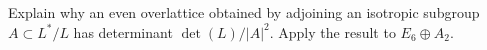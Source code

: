\begin{exercise}\label{ex:c-lattice-5}
Explain why an even overlattice obtained by adjoining an isotropic
subgroup $A\subset L^*/L$ has determinant $\det(L)/|A|^2$. Apply
the result to $E_6\oplus A_2$.

\par\smallskip{}\par
\end{exercise}

